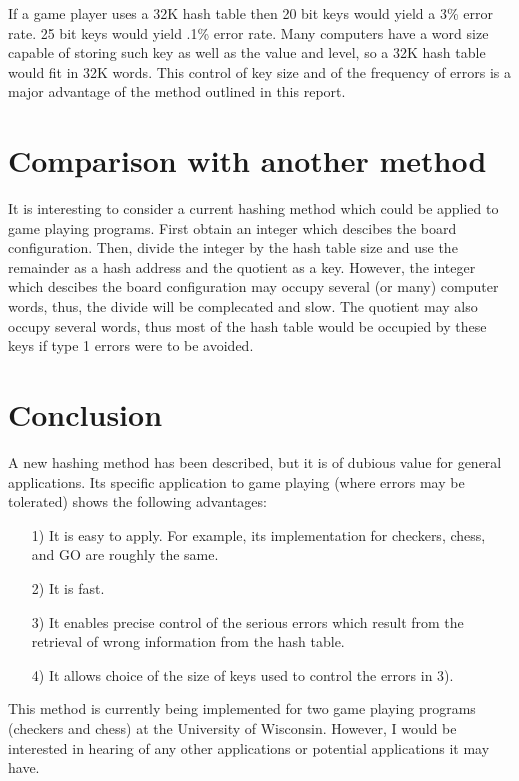 \documentclass{article}
\begin{document}
If a game player uses a 32K hash table then 20 bit keys would yield a 3\% error
rate. 25 bit keys would yield .1\% error rate. Many computers have a word size
capable of storing such key as well as the value and level, so a 32K hash table
would fit in 32K words. This control of key size and of the frequency of errors
is a major advantage of the method outlined in this report.

\section*{Comparison with another method}

It is interesting to consider a current hashing method which could be applied
to game playing programs. First obtain an integer which descibes the board
configuration. Then, divide the integer by the hash table size and use the
remainder as a hash address and the quotient as a key. However, the integer
which descibes the board configuration may occupy several (or many) computer
words, thus, the divide will be complecated and slow. The quotient may also
occupy several words, thus most of the hash table would be occupied by these
keys if type 1 errors were to be avoided.

\section*{Conclusion}

A new hashing method has been described, but it is of dubious value for general
applications. Its specific application to game playing (where errors may be
tolerated) shows the following advantages:

\begin{itemize}
\item[1)] It is easy to apply. For example, its implementation for checkers, chess, and GO are roughly the same.
\item[2)] It is fast.
\item[3)] It enables precise control of the serious errors which result from the retrieval of wrong information from the hash table.
\item[4)] It allows choice of the size of keys used to control the errors in 3).
\end{itemize}

This method is currently being implemented for two game playing programs
(checkers and chess) at the University of Wisconsin. However, I would be
interested in hearing of any other applications or potential applications it
may have.
\end{document}
